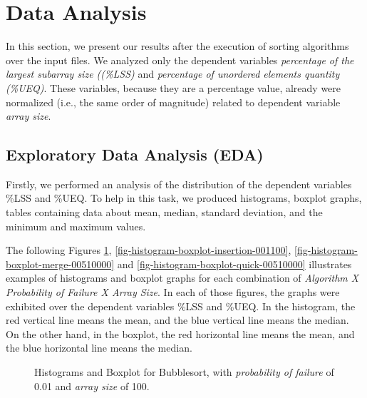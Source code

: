 \section{Data Analysis}

In this section, we present our results after the execution of sorting algorithms over the input files. We analyzed only the dependent variables \textit{percentage of the largest subarray size ((\%LSS)} and \textit{percentage of unordered elements quantity (\%UEQ)}. These variables, because they are a percentage value, already were normalized (i.e., the same order of magnitude) related to dependent variable \textit{array size}.

\subsection{Exploratory Data Analysis (EDA)}

Firstly, we performed an analysis of the distribution of the dependent variables \%LSS and \%UEQ. To help in this task, we produced histograms, boxplot graphs, tables containing data about mean, median, standard deviation, and the minimum and maximum values.

The following Figures \ref{fig-histogram-boxplot-bubble-001100}, \ref{fig-histogram-boxplot-insertion-001100}, \ref{fig-histogram-boxplot-merge-00510000} and \ref{fig-histogram-boxplot-quick-00510000} illustrates examples of histograms and boxplot graphs for each combination of \textit{Algorithm X Probability of Failure X Array Size}. In each of those figures, the graphs were exhibited over the dependent variables \%LSS and \%UEQ.  In the histogram, the red vertical line means the mean, and the blue vertical line means the median. On the other hand, in the boxplot, the red horizontal line means the mean, and the blue horizontal line means the median.

\begin{figure}[H]
    \centering
    \caption{Histograms and Boxplot for Bubblesort, with \textit{probability of failure} of 0.01 and \textit{array size} of 100.}
    \label{fig-histogram-boxplot-bubble-001100}
\end{figure}

